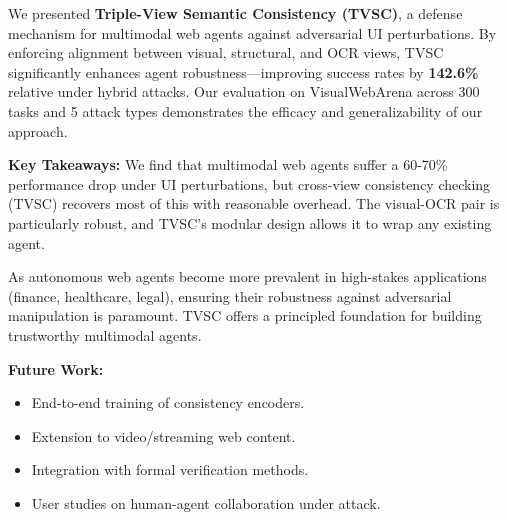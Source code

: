 \documentclass{llncs}
\begin{document}
We presented \textbf{Triple-View Semantic Consistency (TVSC)}, a defense mechanism for multimodal web agents against adversarial UI perturbations. By enforcing alignment between visual, structural, and OCR views, TVSC significantly enhances agent robustness---improving success rates by \textbf{142.6\%} relative under hybrid attacks. Our evaluation on VisualWebArena across 300 tasks and 5 attack types demonstrates the efficacy and generalizability of our approach.

\textbf{Key Takeaways:} We find that multimodal web agents suffer a 60-70\% performance drop under UI perturbations, but cross-view consistency checking (TVSC) recovers most of this with reasonable overhead. The visual-OCR pair is particularly robust, and TVSC's modular design allows it to wrap any existing agent.

As autonomous web agents become more prevalent in high-stakes applications (finance, healthcare, legal), ensuring their robustness against adversarial manipulation is paramount. TVSC offers a principled foundation for building trustworthy multimodal agents.

\textbf{Future Work:}
\begin{itemize}
    \item End-to-end training of consistency encoders.
    \item Extension to video/streaming web content.
    \item Integration with formal verification methods.
    \item User studies on human-agent collaboration under attack.
\end{itemize}
\end{document}
